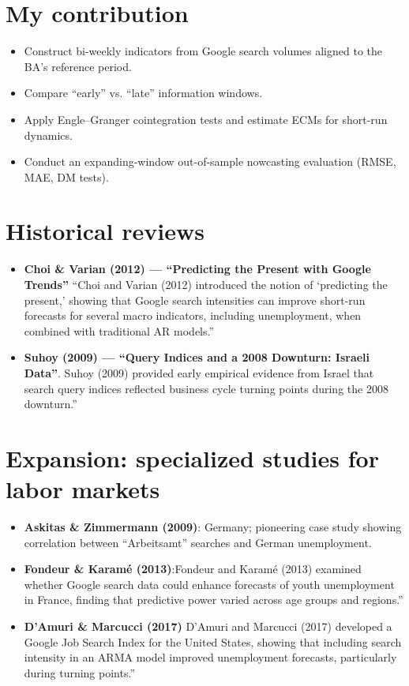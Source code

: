\documentclass{article}
\begin{document}
\section{My contribution}
\begin{itemize}
    \item Construct bi-weekly indicators from Google search volumes aligned to the BA’s reference period.
    \item Compare “early” vs. “late” information windows.
    \item Apply Engle–Granger cointegration tests and estimate ECMs for short-run dynamics.
    \item Conduct an expanding-window out-of-sample nowcasting evaluation (RMSE, MAE, DM tests).
\end{itemize}

\section{Historical reviews}
\begin{itemize}
    \item \textbf{Choi \& Varian (2012) — “Predicting the Present with Google Trends”} 
    “Choi and Varian (2012) introduced the notion of ‘predicting the present,’ showing that Google search intensities can improve short-run forecasts for several macro indicators, including unemployment, when combined with traditional AR models.”
    \item \textbf{Suhoy (2009) — “Query Indices and a 2008 Downturn: Israeli Data”}.
    Suhoy (2009) provided early empirical evidence from Israel that search query indices reflected business cycle turning points during the 2008 downturn.”
\end{itemize}

\section{Expansion: specialized studies for labor markets}
\begin{itemize}
    \item \textbf{Askitas \& Zimmermann (2009)}: Germany; pioneering case study showing correlation between “Arbeitsamt” searches and German unemployment.
    \item \textbf{Fondeur \& Karamé (2013)}:Fondeur and Karamé (2013) examined whether Google search data could enhance forecasts of youth unemployment in France, finding that predictive power varied across age groups and regions.”
    \item \textbf{D’Amuri \& Marcucci (2017)}
    D’Amuri and Marcucci (2017) developed a Google Job Search Index for the United States, showing that including search intensity in an ARMA model improved unemployment forecasts, particularly during turning points.”
\end{itemize}
\end{document}
